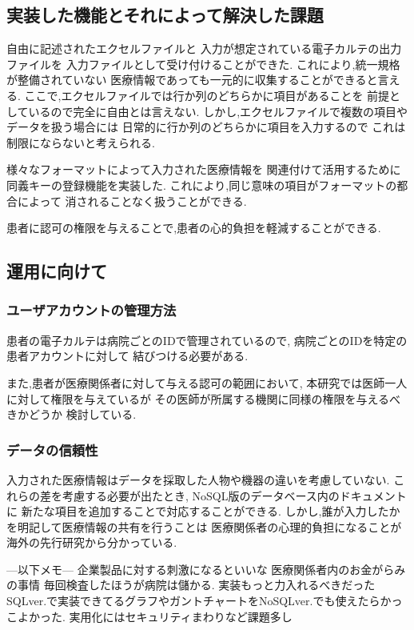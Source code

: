 \subsection{実装した機能とそれによって解決した課題}
  自由に記述されたエクセルファイルと
  入力が想定されている電子カルテの出力ファイルを
  入力ファイルとして受け付けることができた.
  これにより,統一規格が整備されていない
  医療情報であっても一元的に収集することができると言える.
  ここで,エクセルファイルでは行か列のどちらかに項目があることを
  前提としているので完全に自由とは言えない.
  しかし,エクセルファイルで複数の項目やデータを扱う場合には
  日常的に行か列のどちらかに項目を入力するので
  これは制限にならないと考えられる.

  様々なフォーマットによって入力された医療情報を
  関連付けて活用するために同義キーの登録機能を実装した.
  これにより,同じ意味の項目がフォーマットの都合によって
  消されることなく扱うことができる.

  患者に認可の権限を与えることで,患者の心的負担を軽減することができる.


\subsection{運用に向けて}
  \subsubsection{ユーザアカウントの管理方法}
    患者の電子カルテは病院ごとのIDで管理されているので,
    病院ごとのIDを特定の患者アカウントに対して
    結びつける必要がある.

    また,患者が医療関係者に対して与える認可の範囲において,
    本研究では医師一人に対して権限を与えているが
    その医師が所属する機関に同様の権限を与えるべきかどうか
    検討している.
  \fi

  \subsubsection{データの信頼性}
    入力された医療情報はデータを採取した人物や機器の違いを考慮していない.
    これらの差を考慮する必要が出たとき,
    NoSQL版のデータベース内のドキュメントに
    新たな項目を追加することで対応することができる.
    しかし,誰が入力したかを明記して医療情報の共有を行うことは
    医療関係者の心理的負担になることが海外の先行研究から分かっている.
    \cite{bibi10}

---以下メモ---
企業製品に対する刺激になるといいな
医療関係者内のお金がらみの事情
   毎回検査したほうが病院は儲かる.
実装もっと力入れるべきだった
    SQLver.で実装できてるグラフやガントチャートをNoSQLver.でも使えたらかっこよかった.
実用化にはセキュリティまわりなど課題多し
\fi


